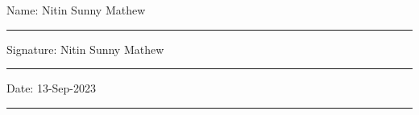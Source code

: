 \documentclass[11pt,oneside]{book}
\begin{document}
\noindent Name: Nitin Sunny Mathew\\[1mm]
\rule[1em]{25em}{0.5pt}

\noindent Signature: Nitin Sunny Mathew\\[1mm]
\rule[1em]{25em}{0.5pt}

\noindent Date: 13-Sep-2023\\[1mm]
\rule[1em]{25em}{0.5pt}



\tableofcontents
\listoffigures
\listoftables


\mainmatter












\begin{appendices}
    
    
\end{appendices}
\end{document}
